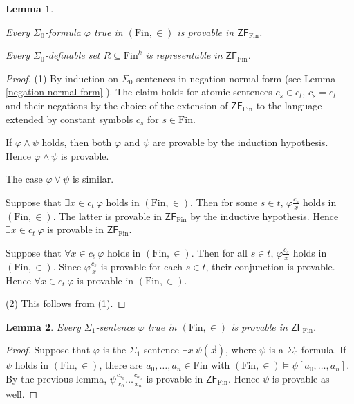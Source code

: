 \documentclass[a4paper, 11pt]{amsart}
\newtheorem{lemma}[lemma]{Lemma}
\theoremstyle{remark}
\newcommand{\axiomft}[1]{\mathsf{#1}}
\newcommand{\ZF}{\axiomft{ZF}}
\newcommand{\Fin}{\mathrm{Fin}}
\newenvironment{enumerate-(1)}{\begin{enumerate}[label={\upshape (\arabic*)}, leftmargin=2pc]}{\end{enumerate}}
\begin{document}
\begin{lemma} \ 
\label{Sigma0 truths are provable} 
\begin{enumerate-(1)} 
\item 
Every $\Sigma_0$-formula $\varphi$ true in $(\Fin,\in)$ is provable in $\ZF_\Fin$. 
\item 
Every $\Sigma_0$-definable set $R\subseteq \Fin^k$ is representable in $\ZF_\Fin$. 
\end{enumerate-(1)} 
\end{lemma} 
\begin{proof} 
(1) By induction on $\Sigma_0$-sentences in negation normal form (see Lemma \ref{negation normal form} ). 
The claim holds for atomic sentences $c_s\in c_t$, $c_s=c_t$ and their negations by the choice of the extension of $\ZF_\Fin$ to the language extended by constant symbols $c_s$ for $s\in \Fin$. 

If $\varphi \wedge \psi$ holds, then both $\varphi$ and $\psi$ are provable by the induction hypothesis. Hence $\varphi\wedge \psi$ is provable. 

The case $\varphi \vee \psi$ is similar. 

Suppose that $\exists x\in c_t\ \varphi$ holds in $(\Fin,\in)$. 
Then for some $s\in t$, $\varphi\frac{c_s}{x}$ holds in $(\Fin,\in)$. 
The latter is provable in $\ZF_\Fin$ by the inductive hypothesis. 
Hence  $\exists x\in c_t\ \varphi$ is provable in $\ZF_\Fin$. 

Suppose that $\forall x\in c_t\ \varphi$ holds in $(\Fin,\in)$. 
Then for all $s\in t$, $\varphi\frac{c_s}{x}$ holds in $(\Fin,\in)$. 
Since $\varphi\frac{c_s}{x}$  is provable for each $s\in t$, their conjunction is provable. 
Hence $\forall x\in c_t\ \varphi$ is provable in $(\Fin,\in)$. 

(2) This follows from (1). 
\end{proof} 

\begin{lemma} 
\label{Sigma1 truths are provable} 
Every $\Sigma_1$-sentence $\varphi$ true in $(\Fin,\in)$ is provable in $\ZF_\Fin$. 
\end{lemma} 
\begin{proof} 
Suppose that $\varphi$ is the $\Sigma_1$-sentence $\exists x \ \psi(\vec{x})$, where $\psi$ is a $\Sigma_0$-formula. 
If $\psi$ holds in $(\Fin,\in)$, there are $a_0,\dots,a_n\in \Fin$ with $(\Fin,\in)\models \psi[a_0,\dots,a_n]$. 
By the previous lemma, $\psi\frac{c_{a_0}}{x_0}\dots\frac{c_{a_n}}{x_n}$ is provable in $\ZF_\Fin$. 
Hence $\psi$ is provable as well. 
\end{proof} 
\end{document}
